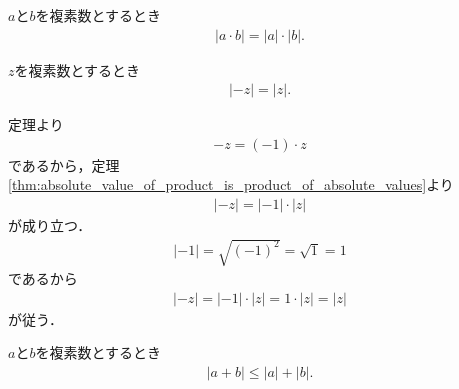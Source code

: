 	\begin{screen}
		\begin{thm}[積の絶対値は絶対値の積]
		\label{thm:absolute_value_of_product_is_product_of_absolute_values}
			$a$と$b$を複素数とするとき
			\begin{align}
				|a \cdot b| = |a| \cdot |b|.
			\end{align}
		\end{thm}
	\end{screen}
	
	\begin{sketch}
		
	\end{sketch}
	
	\begin{screen}
		\begin{thm}[逆元の絶対値は等しい]
			$z$を複素数とするとき
			\begin{align}
				|-z| = |z|.
			\end{align}
		\end{thm}
	\end{screen}
	
	\begin{sketch}
		定理より
		\begin{align}
			-z = (-1) \cdot z
		\end{align}
		であるから，定理\ref{thm:absolute_value_of_product_is_product_of_absolute_values}より
		\begin{align}
			|-z| = |-1| \cdot |z|
		\end{align}
		が成り立つ．
		\begin{align}
			|-1| = \sqrt{(-1)^2} = \sqrt{1} = 1
		\end{align}
		であるから
		\begin{align}
			|-z| = |-1| \cdot |z| = 1 \cdot |z| = |z|
		\end{align}
		が従う．
		\QED
	\end{sketch}
	
	\begin{screen}
		\begin{thm}[劣加法性]
			$a$と$b$を複素数とするとき
			\begin{align}
				|a + b| \leq |a| + |b|.
			\end{align}
		\end{thm}
	\end{screen}
	
	\begin{sketch}
		
	\end{sketch}
	